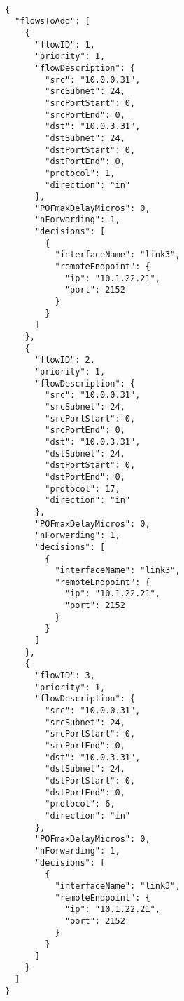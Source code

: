 \clearpage

\begin{lstlisting}[style=json, caption={Format of Flow Forwarding Decisions from Control Plane}, label={lst:flow}]

{
  "flowsToAdd": [
    {
      "flowID": 1,
      "priority": 1,
      "flowDescription": {
        "src": "10.0.0.31",
        "srcSubnet": 24,
        "srcPortStart": 0,
        "srcPortEnd": 0,
        "dst": "10.0.3.31",
        "dstSubnet": 24,
        "dstPortStart": 0,
        "dstPortEnd": 0,
        "protocol": 1,
        "direction": "in"
      },
      "POFmaxDelayMicros": 0,
      "nForwarding": 1,
      "decisions": [
        {
          "interfaceName": "link3",
          "remoteEndpoint": {
            "ip": "10.1.22.21",
            "port": 2152
          }
        }
      ]
    },
    {
      "flowID": 2,
      "priority": 1,
      "flowDescription": {
        "src": "10.0.0.31",
        "srcSubnet": 24,
        "srcPortStart": 0,
        "srcPortEnd": 0,
        "dst": "10.0.3.31",
        "dstSubnet": 24,
        "dstPortStart": 0,
        "dstPortEnd": 0,
        "protocol": 17,
        "direction": "in"
      },
      "POFmaxDelayMicros": 0,
      "nForwarding": 1,
      "decisions": [
        {
          "interfaceName": "link3",
          "remoteEndpoint": {
            "ip": "10.1.22.21",
            "port": 2152
          }
        }
      ]
    },
    {
      "flowID": 3,
      "priority": 1,
      "flowDescription": {
        "src": "10.0.0.31",
        "srcSubnet": 24,
        "srcPortStart": 0,
        "srcPortEnd": 0,
        "dst": "10.0.3.31",
        "dstSubnet": 24,
        "dstPortStart": 0,
        "dstPortEnd": 0,
        "protocol": 6,
        "direction": "in"
      },
      "POFmaxDelayMicros": 0,
      "nForwarding": 1,
      "decisions": [
        {
          "interfaceName": "link3",
          "remoteEndpoint": {
            "ip": "10.1.22.21",
            "port": 2152
          }
        }
      ]
    }
  ]
}


\end{lstlisting}

\clearpage

